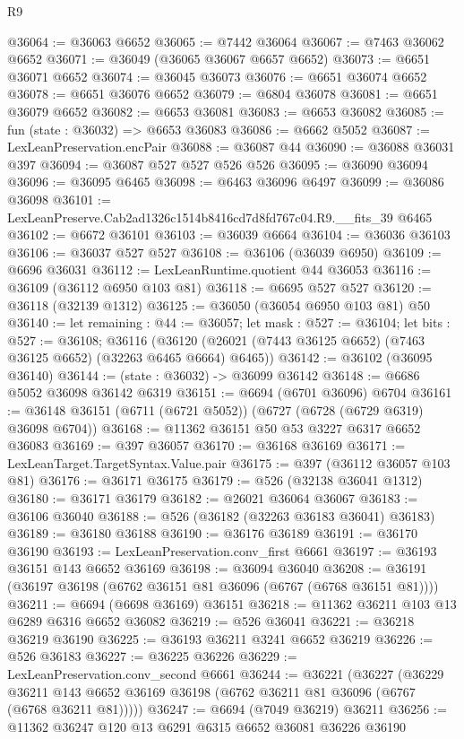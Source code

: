 \begin{lexlean}{R9}
\begin{coremodule}
@36064 := @36063 @6652
@36065 := @7442 @36064
@36067 := @7463 @36062 @6652
@36071 := @36049 (@36065 @36067 @6657 @6652)
@36073 := @6651 @36071 @6652
@36074 := @36045 @36073
@36076 := @6651 @36074 @6652
@36078 := @6651 @36076 @6652
@36079 := @6804 @36078
@36081 := @6651 @36079 @6652
@36082 := @6653 @36081
@36083 := @6653 @36082
@36085 := fun (state : @36032) => @6653 @36083
@36086 := @6662 @5052
@36087 := LexLeanPreservation.encPair
@36088 := @36087 @44
@36090 := @36088 @36031 @397
@36094 := @36087 @527 @527 @526 @526
@36095 := @36090 @36094
@36096 := @36095 @6465
@36098 := @6463 @36096 @6497
@36099 := @36086 @36098
@36101 := LexLeanPreserve.Cab2ad1326c1514b8416cd7d8fd767c04.R9.__fits_39 @6465
@36102 := @6672 @36101
@36103 := @36039 @6664
@36104 := @36036 @36103
@36106 := @36037 @527 @527
@36108 := @36106 (@36039 @6950)
@36109 := @6696 @36031
@36112 := LexLeanRuntime.quotient @44 @36053
@36116 := @36109 (@36112 @6950 @103 @81)
@36118 := @6695 @527 @527
@36120 := @36118 (@32139 @1312)
@36125 := @36050 (@36054 @6950 @103 @81) @50
@36140 := let remaining : @44 := @36057;
  let mask : @527 := @36104;
  let bits : @527 := @36108;
  @36116 (@36120 (@26021 (@7443 @36125 @6652) (@7463 @36125 @6652) (@32263 @6465 @6664) @6465))
@36142 := @36102 (@36095 @36140)
@36144 := (state : @36032) -> @36099 @36142
@36148 := @6686 @5052 @36098 @36142 @6319
@36151 := @6694 (@6701 @36096) @6704
@36161 := @36148 @36151 (@6711 (@6721 @5052)) (@6727 (@6728 (@6729 @6319) @36098 @6704))
@36168 := @11362 @36151 @50 @53 @3227 @6317 @6652 @36083
@36169 := @397 @36057
@36170 := @36168 @36169
@36171 := LexLeanTarget.TargetSyntax.Value.pair
@36175 := @397 (@36112 @36057 @103 @81)
@36176 := @36171 @36175
@36179 := @526 (@32138 @36041 @1312)
@36180 := @36171 @36179
@36182 := @26021 @36064 @36067
@36183 := @36106 @36040
@36188 := @526 (@36182 (@32263 @36183 @36041) @36183)
@36189 := @36180 @36188
@36190 := @36176 @36189
@36191 := @36170 @36190
@36193 := LexLeanPreservation.conv_first @6661
@36197 := @36193 @36151 @143 @6652 @36169
@36198 := @36094 @36040
@36208 := @36191 (@36197 @36198 (@6762 @36151 @81 @36096 (@6767 (@6768 @36151 @81))))
@36211 := @6694 (@6698 @36169) @36151
@36218 := @11362 @36211 @103 @13 @6289 @6316 @6652 @36082
@36219 := @526 @36041
@36221 := @36218 @36219 @36190
@36225 := @36193 @36211 @3241 @6652 @36219
@36226 := @526 @36183
@36227 := @36225 @36226
@36229 := LexLeanPreservation.conv_second @6661
@36244 := @36221
    (@36227
      (@36229 @36211 @143 @6652 @36169 @36198 (@6762 @36211 @81 @36096 (@6767 (@6768 @36211 @81)))))
@36247 := @6694 (@7049 @36219) @36211
@36256 := @11362 @36247 @120 @13 @6291 @6315 @6652 @36081 @36226 @36190

\end{coremodule}
\end{lexlean}
